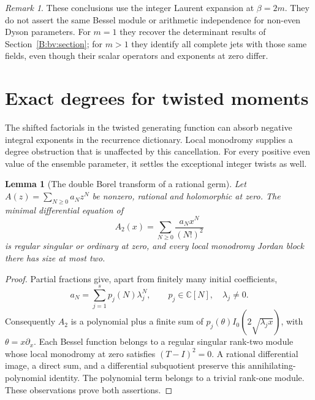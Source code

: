 \documentclass[11pt,a4paper]{article}
\newtheorem{lemma}[theorem]{Lemma}
\theoremstyle{definition}
\theoremstyle{remark}
\newtheorem{remark}[theorem]{Remark}
\numberwithin{equation}{section}
\begin{document}
\begin{remark}
These conclusions use the integer Laurent expansion at
$\beta=2m$. They do not assert the same Bessel module or
arithmetic independence for non-even Dyson parameters.
For $m=1$ they recover the determinant results of
Section~\ref{B:bv:section}; for $m>1$ they identify all complete
jets with those same fields, even though their scalar operators
and exponents at zero differ.
\end{remark}


\section{Exact degrees for twisted moments}
\label{vtd:section}

The shifted factorials in the twisted generating function can absorb
negative integral exponents in the recurrence dictionary.  Local
monodromy supplies a degree obstruction that is unaffected by this
cancellation.  For every positive even value of the ensemble parameter,
it settles the exceptional integer twists as well.

\begin{lemma}[The double Borel transform of a rational germ]
\label{vtd:rational-double-borel}
Let $A(z)=\sum_{N\ge0}a_Nz^N$ be nonzero, rational and holomorphic at zero.
The minimal differential equation of
\[
                 A_2(x)=\sum_{N\ge0}\frac{a_Nx^N}{(N!)^2}
\]
is regular singular or ordinary at zero, and every local monodromy
Jordan block there has size at most two.
\end{lemma}
\begin{proof}
Partial fractions give, apart from finitely many initial coefficients,
\[
                    a_N=\sum_{j=1}^s p_j(N)\lambda_j^N,
        \qquad p_j\in\mathbb C[N],\quad\lambda_j\ne0.
\]
Consequently $A_2$ is a polynomial plus a finite sum of
$p_j(\theta)I_0(2\sqrt{\lambda_jx})$, with
$\theta=x\partial_x$.  Each Bessel function belongs to a regular
singular rank-two module whose local monodromy at zero satisfies
$(T-I)^2=0$.  A rational differential image, a direct sum, and a
differential subquotient preserve this annihilating-polynomial
identity.  The polynomial term belongs to a trivial rank-one module.
These observations prove both assertions.
\end{proof}
\end{document}
